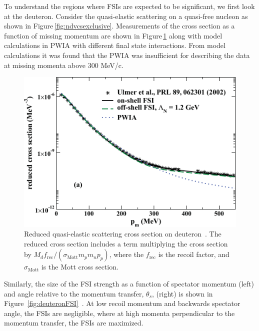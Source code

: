 To understand the regions where FSIs are expected to be significant, we first 
look at the deuteron. Consider the quasi-elastic scattering on a quasi-free 
nucleon as shown in Figure\,\ref{fig:ndvcsexclusive}. Measurements of the  cross section as a 
function of missing momentum are shown in 
Figure\,\ref{fig:quasiElasticDeuteronFSI} along with model calculations in PWIA 
with different final state interactions. From model calculations it was found 
that the PWIA was insufficient for describing the data at missing momenta above 
300 MeV/c.
\begin{figure}
   \centering
   \includegraphics{figures/elastic_deuteron_FSI.pdf}
   \caption{\label{fig:quasiElasticDeuteronFSI}Reduced quasi-elastic scattering 
   cross section on deuteron~\cite{Jeschonnek:2008zg}. The reduced cross 
   section includes a term multiplying the cross section by $M_d 
   f_{\text{rec}}/(\sigma_{\text{Mott}} m_p m_n p_p)$, where the 
   $f_{\text{rec}}$ is the recoil factor, and $\sigma_{\text{Mott}}$ is the 
   Mott cross section.}
\end{figure}
Similarly, the size of the FSI strength as a function of spectator momentum 
(left) and angle relative to the momentum transfer, $\theta_s$, (right) is 
shown in 
Figure~\ref{fig:deuteronFSI}~\cite{CiofidegliAtti:2003pb,CiofidegliAtti:2002as}.  
At low recoil momentum and backwards spectator angle, the FSIs are negligible, 
where at high momenta perpendicular to the momentum transfer, the FSIs are 
maximized.

